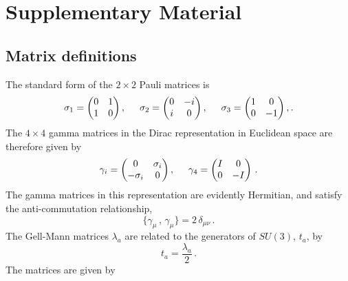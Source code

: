 \chapter{Supplementary Material}
\section{Matrix definitions}\label{app:GellMann}
The standard form of the $2\times 2$ Pauli matrices is
%
\begin{equation}
\sigma_1 = \begin{pmatrix}
0 & 1\\
1 & 0
\end{pmatrix},
\hspace{0.5cm}
\sigma_2 = \begin{pmatrix}
0 & -i\\
i & 0
\end{pmatrix},
\hspace{0.5cm}
\sigma_3 = \begin{pmatrix}
1 & 0\\
0 & -1
\end{pmatrix}\\, .
\end{equation}
%
The $4\times 4$ gamma matrices in the Dirac representation in Euclidean space are therefore given by
%
\begin{equation}
\gamma_i = \begin{pmatrix}
0 & \sigma_i\\
-\sigma_i & 0
\end{pmatrix},
\hspace{0.5cm}
\gamma_4 = \begin{pmatrix}
I & 0\\
0 & -I
\end{pmatrix}\, .
\end{equation} 
%
The gamma matrices in this representation are evidently Hermitian, and satisfy the anti-commutation relationship,
%
\begin{equation}
\lbrace \gamma_\mu\, ,\, \gamma_\mu \rbrace = 2\,\delta_{\mu\nu}\, .
\end{equation}
%
The Gell-Mann matrices $\lambda_a$ are related to the generators of $SU(3)$, $t_a$, by~\cite{peskin2018introduction}
%
\begin{equation}
t_a = \frac{\lambda_a}{2}\, .
\end{equation}
%
The matrices are given by
%
